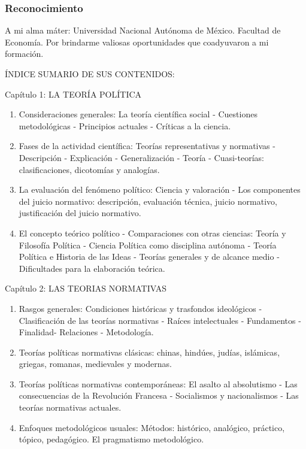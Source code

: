 \documentclass[
]{book}
\begin{document}
\hypertarget{reconocimiento}{%
\subsubsection*{Reconocimiento}\label{reconocimiento}}

A mi alma máter: Universidad Nacional Autónoma de México. Facultad de Economía. Por brindarme valiosas oportunidades que coadyuvaron a mi formación.

ÍNDICE SUMARIO DE SUS CONTENIDOS:

Capítulo 1: LA TEORÍA POLÍTICA

\begin{enumerate}
\def\labelenumi{\alph{enumi})}
\item
  Consideraciones generales: La teoría científica social - Cuestiones metodológicas - Principios actuales - Críticas a la ciencia.
\item
  Fases de la actividad científica: Teorías representativas y normativas - Descripción - Explicación - Generalización - Teoría - Cuasi-teorías: clasificaciones, dicotomías y analogías.
\item
  La evaluación del fenómeno político: Ciencia y valoración - Los componentes del juicio normativo: descripción, evaluación técnica, juicio normativo, justificación del juicio normativo.
\item
  El concepto teórico político - Comparaciones con otras ciencias: Teoría y Filosofía Política - Ciencia Política como disciplina autónoma - Teoría Política e Historia de las Ideas - Teorías generales y de alcance medio - Dificultades para la elaboración teórica.
\end{enumerate}

Capítulo 2: LAS TEORIAS NORMATIVAS

\begin{enumerate}
\def\labelenumi{\alph{enumi})}
\item
  Rasgos generales: Condiciones históricas y trasfondos ideológicos - Clasificación de las teorías normativas - Raíces intelectuales - Fundamentos - Finalidad- Relaciones - Metodología.
\item
  Teorías políticas normativas clásicas: chinas, hindúes, judías, islámicas, griegas, romanas, medievales y modernas.
\item
  Teorías políticas normativas contemporáneas: El asalto al absolutismo - Las consecuencias de la Revolución Francesa - Socialismos y nacionalismos - Las teorías normativas actuales.
\item
  Enfoques metodológicos usuales: Métodos: histórico, analógico, práctico, tópico, pedagógico. El pragmatismo metodológico.
\end{enumerate}
\end{document}
